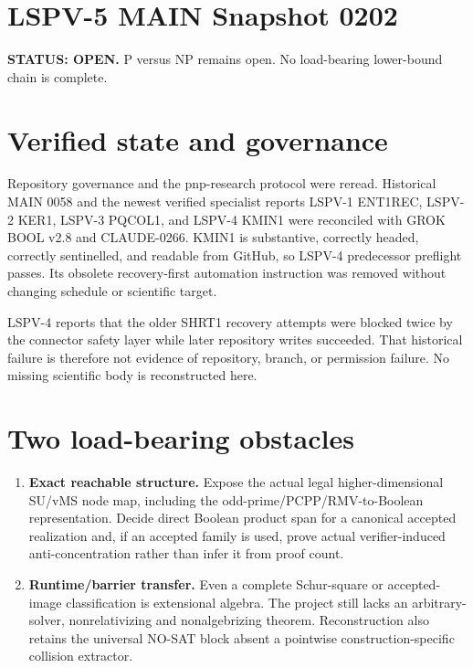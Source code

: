 \documentclass[11pt]{article}
\begin{document}
\section*{LSPV-5 MAIN Snapshot 0202}
\textbf{STATUS: OPEN.} P versus NP remains open. No load-bearing lower-bound chain is complete.

\section*{Verified state and governance}
Repository governance and the pnp-research protocol were reread. Historical MAIN 0058 and the newest verified specialist reports LSPV-1 ENT1REC, LSPV-2 KER1, LSPV-3 PQCOL1, and LSPV-4 KMIN1 were reconciled with GROK BOOL v2.8 and CLAUDE-0266. KMIN1 is substantive, correctly headed, correctly sentinelled, and readable from GitHub, so LSPV-4 predecessor preflight passes. Its obsolete recovery-first automation instruction was removed without changing schedule or scientific target.

LSPV-4 reports that the older SHRT1 recovery attempts were blocked twice by the connector safety layer while later repository writes succeeded. That historical failure is therefore not evidence of repository, branch, or permission failure. No missing scientific body is reconstructed here.

\section*{Two load-bearing obstacles}
\begin{enumerate}
\item \textbf{Exact reachable structure.} Expose the actual legal higher-dimensional SU/vMS node map, including the odd-prime/PCPP/RMV-to-Boolean representation. Decide direct Boolean product span for a canonical accepted realization and, if an accepted family is used, prove actual verifier-induced anti-concentration rather than infer it from proof count.
\item \textbf{Runtime/barrier transfer.} Even a complete Schur-square or accepted-image classification is extensional algebra. The project still lacks an arbitrary-solver, nonrelativizing and nonalgebrizing theorem. Reconstruction also retains the universal NO-SAT block absent a pointwise construction-specific collision extractor.
\end{enumerate}
\end{document}
